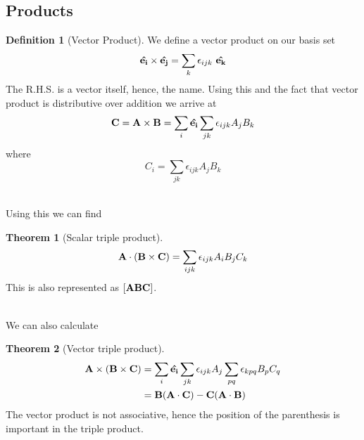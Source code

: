 \documentclass[10pt, a4paper]{extarticle}
\theoremstyle{definition}
\newtheorem{thm}{Theorem}
\newtheorem{defn}{Definition}
\begin{document}
\subsection{Products}
\begin{framed}
	\begin{defn}[Vector Product]
		We define a vector product on our basis set
		\[\vu{e_i}\times\vu{e_j}=\sum_k \epsilon_{ijk}\ \vu{e_k}\]
		The R.H.S. is a vector itself, hence, the name. Using this and the fact that vector product is distributive over addition we arrive at
		\[\vb{C}=\vb{A}\times\vb{B}=\sum_i \vu{e_i}\sum_{jk}\epsilon_{ijk}A_jB_k\]
		where \[C_i=\sum_{jk}\epsilon_{ijk}A_jB_k\]
	\end{defn}
\end{framed}
\hfill\\
Using this we can find
\begin{framed}
	\begin{thm}[Scalar triple product]
		\[\vb{A}\cdot(\vb{B}\times\vb{C})=\sum_{ijk}\epsilon_{ijk}A_iB_jC_k\]
		This is also represented as $[\vb{ABC}]$.
	\end{thm}
\end{framed}
\hfill\\
We can also calculate
\begin{framed}
	\begin{thm}[Vector triple product]
		\begin{align*}
			\vb{A}\times(\vb{B}\times\vb{C}) & =\sum_i \vu{e_i}\sum_{jk}\epsilon_{ijk}A_j\sum_{pq}\epsilon_{kpq}B_pC_q \\
			                                 & =\vb{B}(\vb{A}\cdot\vb{C})-\vb{C}(\vb{A}\cdot\vb{B})
		\end{align*}
		The vector product is not associative, hence the position of the parenthesis is important in the triple product.
	\end{thm}
\end{framed}
\end{document}
